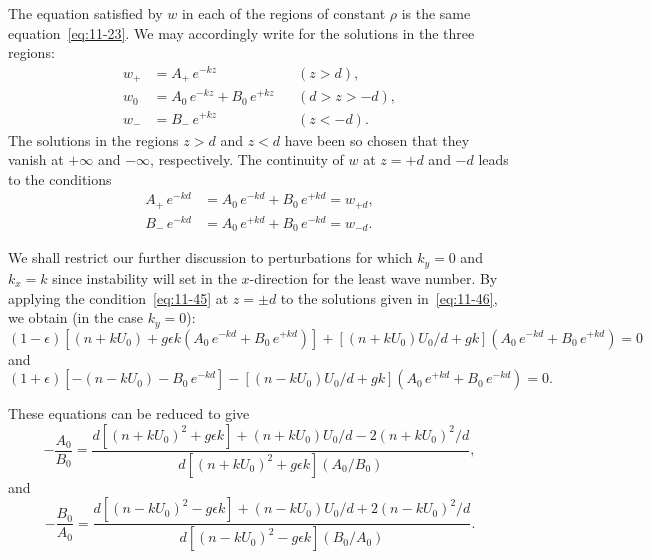 The equation satisfied by $w$ in each of the regions of constant $\rho$ is the same equation~\eqref{eq:11-23}. We may accordingly write for the solutions in the three regions:
\begin{equation}
\label{eq:11-46}
\begin{aligned}
w_+ &= A_+\,e^{-kz} && (z > d), \\
w_0 &= A_0\,e^{-kz}+B_0\,e^{+kz} && (d > z > -d), \\
w_- &= B_-\,e^{+kz} && (z < -d).
\end{aligned}
\end{equation}
The solutions in the regions $z > d$ and $z < d$ have been so chosen that they vanish at $+\infty$ and $-\infty$, respectively. The continuity of $w$ at $z = +d$ and $-d$ leads to the conditions
\begin{equation}
\label{eq:11-47}
\begin{aligned}
A_+\,e^{-kd} &= A_0\,e^{-kd}+B_0\,e^{+kd} = w_{+d}, \\
B_-\,e^{-kd} &= A_0\,e^{+kd}+B_0\,e^{-kd} = w_{-d}.
\end{aligned}
\end{equation}

We shall restrict our further discussion to perturbations for which $k_y = 0$ and $k_x = k$ since instability will set in the $x$-direction for the least wave number. By applying the condition~\eqref{eq:11-45} at $z = \pm d$ to the solutions given in~\eqref{eq:11-46}, we obtain (in the case $k_y = 0$):
\begin{equation}
\label{eq:11-48}
(1-\epsilon)\!\left[(n+kU_0)+g\epsilon k(A_0\,e^{-kd}+B_0\,e^{+kd})\right] + \left[(n+kU_0)U_0/d+gk\right]\!(A_0\,e^{-kd}+B_0\,e^{+kd}) = 0
\end{equation}
and
\begin{equation}
\label{eq:11-49}
(1+\epsilon)\!\left[-(n-kU_0)-B_0\,e^{-kd}\right] - \left[(n-kU_0)U_0/d + gk\right](A_0\,e^{+kd}+B_0\,e^{-kd}) = 0.
\end{equation}

These equations can be reduced to give
\begin{equation}
\label{eq:11-50}
-\frac{A_0}{B_0} = \frac{d\!\left[(n+kU_0)^2+g\epsilon k\right]+(n+kU_0)U_0/d - 2(n+kU_0)^2/d}{d\!\left[(n+kU_0)^2+g\epsilon k\right](A_0/B_0)},
\end{equation}
and
\begin{equation}
\label{eq:11-51}
-\frac{B_0}{A_0} = \frac{d\!\left[(n-kU_0)^2-g\epsilon k\right]+(n-kU_0)U_0/d + 2(n-kU_0)^2/d}{d\!\left[(n-kU_0)^2-g\epsilon k\right](B_0/A_0)}.
\end{equation}


